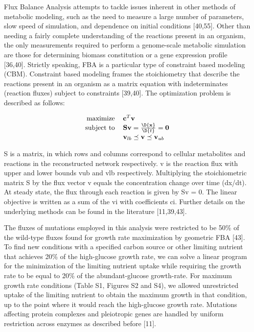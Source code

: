 Flux Balance Analysis attempts to tackle issues inherent in other
methods of metabolic modeling, such as the need to measure a large
number of parameters, slow speed of simulation, and dependence on
initial conditions [40,55]. Other than needing a fairly complete
understanding of the reactions present in an organism, the only
measurements required to perform a genome-scale metabolic simulation
are those for determining biomass constitution or a gene expression
profile [36,40]. Strictly speaking, FBA is a particular type of
constraint based modeling (CBM). Constraint based modeling frames the
stoichiometry that describe the reactions present in an organism as a
matrix equation with indeterminates (reaction fluxes) subject to
constraints [39,40]. The optimization problem is described as follows:


\begin{equation}
\centering
\begin{tabular}{rl}
maximize   & $\mathbf{c}^T\mathbf{v}$                                     \\
subject to & $\mathbf{S v} = \frac{\D{\mathbf{x}}}{\D{t}} = \mathbf{0}$   \\
           & $\mathbf{v}_{lb} \preceq \mathbf{v} \preceq \mathbf{v}_{ub}$ \\
\end{tabular}
\end{equation}

S is a matrix, in which rows and columns correspond to cellular
metabolites and reactions in the reconstructed network respectively. v
is the reaction flux with upper and lower bounds vub and vlb
respectively. Multiplying the stoichiometric matrix S by the flux
vector v equals the concentration change over time (dx/dt). At steady
state, the flux through each reaction is given by Sv = 0. The linear
objective is written as a sum of the vi with coefficients ci. Further
details on the underlying methods can be found in the literature
[11,39,43].

The fluxes of mutations employed in this analysis were restricted to
be 50\% of the wild-type fluxes found for growth rate maximization by
geometric FBA [43]. To find new conditions with a specified carbon
source or other limiting nutrient that achieves 20\% of the
high-glucose growth rate, we can solve a linear program for the
minimization of the limiting nutrient uptake while requiring the
growth rate to be equal to 20\% of the abundant-glucose
growth-rate. For maximum growth rate conditions (Table S1, Figures S2
and S4), we allowed unrestricted uptake of the limiting nutrient to
obtain the maximum growth in that condition, up to the point where it
would reach the high-glucose growth rate. Mutations affecting protein
complexes and pleiotropic genes are handled by uniform restriction
across enzymes as described before [11].

